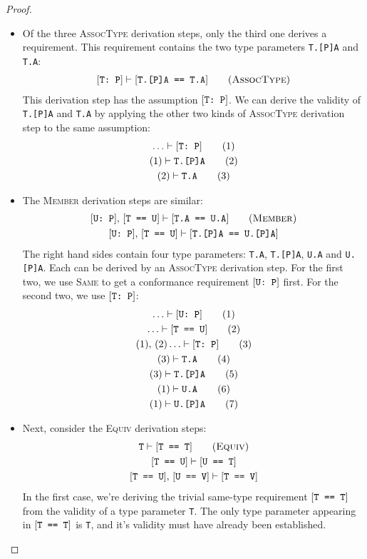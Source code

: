 \documentclass[../generics]{subfiles}
\begin{document}
\begin{proof}
\begin{itemize}
\item
Of the three \textsc{AssocType} derivation steps, only the third one derives a requirement. This requirement contains the two type parameters \texttt{T.[P]A} and \texttt{T.A}:
\begin{gather*}
\ConfReq{T}{P}\vdash\FormalReq{T.[P]A == T.A}\tag{\textsc{AssocType}}
\end{gather*}
This derivation step has the assumption $[\texttt{T:~P}]$. We can derive the validity of \texttt{T.[P]A} and \texttt{T.A} by applying the other two kinds of \textsc{AssocType} derivation step to the same assumption:
\begin{gather*}
\ldots\vdash[\texttt{T:~P}]\tag{1}\\
(1)\vdash\texttt{T.[P]A}\tag{2}\\
(2)\vdash\texttt{T.A}\tag{3}
\end{gather*}

\item
The \textsc{Member} derivation steps are similar:
\begin{gather*}
\ConfReq{U}{P},\,\FormalReq{T == U}\vdash\FormalReq{T.A == U.A}\tag{\textsc{Member}}\\
\ConfReq{U}{P},\,\FormalReq{T == U}\vdash\FormalReq{T.[P]A == U.[P]A}
\end{gather*}
The right hand sides contain four type parameters: \texttt{T.A}, \texttt{T.[P]A}, \texttt{U.A} and \texttt{U.[P]A}. Each can be derived by an \textsc{AssocType} derivation step. For the first two, we use \textsc{Same} to get a conformance requirement $[\texttt{U:~P}]$ first. For the second two, we use $[\texttt{T:~P}]$:
\begin{gather*}
\ldots\vdash [\texttt{U:~P}]\tag{1}\\
\ldots\vdash [\texttt{T == U}]\tag{2}\\
(1),\,(2)\ldots\vdash [\texttt{T:~P}]\tag{3}\\
(3)\vdash \texttt{T.A}\tag{4}\\
(3)\vdash \texttt{T.[P]A}\tag{5}\\
(1)\vdash \texttt{U.A}\tag{6}\\
(1)\vdash \texttt{U.[P]A}\tag{7}
\end{gather*}

\item
Next, consider the \textsc{Equiv} derivation steps:
\begin{gather*}
\texttt{T}\vdash\FormalReq{T == T}\tag{\textsc{Equiv}}\\
\FormalReq{T == U}\vdash\FormalReq{U == T}\\
\FormalReq{T == U},\,\FormalReq{U == V}\vdash\FormalReq{T == V}
\end{gather*}
In the first case, we're deriving the trivial same-type requirement $[\texttt{T == T}]$ from the validity of a type parameter \texttt{T}. The only type parameter appearing in $[\texttt{T == T}]$ is \texttt{T}, and it's validity must have already been established.


\end{itemize}
\end{proof}
\end{document}
